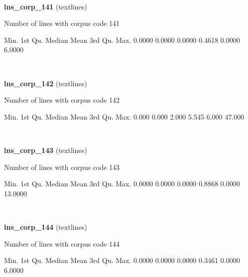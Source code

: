 \documentclass[]{article}
\newenvironment{Shaded}{\begin{snugshade}}{\end{snugshade}}
\newcommand{\FloatTok}[1]{\textcolor[rgb]{0.00,0.00,0.81}{{#1}}}
\newcommand{\NormalTok}[1]{{#1}}
\begin{document}
~

\vspace{1em}

\textbf{lns\_corp\_141} (textlines)

Number of lines with corpus code 141

\begin{Shaded}
\begin{Highlighting}[]
   \NormalTok{Min. 1st Qu.  Median    Mean 3rd Qu.    Max. }
 \FloatTok{0.0000}  \FloatTok{0.0000}  \FloatTok{0.0000}  \FloatTok{0.4618}  \FloatTok{0.0000}  \FloatTok{6.0000} 
\end{Highlighting}
\end{Shaded}

~

\vspace{1em}

\textbf{lns\_corp\_142} (textlines)

Number of lines with corpus code 142

\begin{Shaded}
\begin{Highlighting}[]
   \NormalTok{Min. 1st Qu.  Median    Mean 3rd Qu.    Max. }
  \FloatTok{0.000}   \FloatTok{0.000}   \FloatTok{2.000}   \FloatTok{5.545}   \FloatTok{6.000}  \FloatTok{47.000} 
\end{Highlighting}
\end{Shaded}

~

\vspace{1em}

\textbf{lns\_corp\_143} (textlines)

Number of lines with corpus code 143

\begin{Shaded}
\begin{Highlighting}[]
   \NormalTok{Min. 1st Qu.  Median    Mean 3rd Qu.    Max. }
 \FloatTok{0.0000}  \FloatTok{0.0000}  \FloatTok{0.0000}  \FloatTok{0.8868}  \FloatTok{0.0000} \FloatTok{13.0000} 
\end{Highlighting}
\end{Shaded}

~

\vspace{1em}

\textbf{lns\_corp\_144} (textlines)

Number of lines with corpus code 144

\begin{Shaded}
\begin{Highlighting}[]
   \NormalTok{Min. 1st Qu.  Median    Mean 3rd Qu.    Max. }
 \FloatTok{0.0000}  \FloatTok{0.0000}  \FloatTok{0.0000}  \FloatTok{0.3461}  \FloatTok{0.0000}  \FloatTok{6.0000} 
\end{Highlighting}
\end{Shaded}
\end{document}
